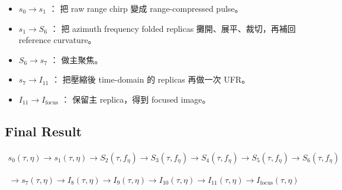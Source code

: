 \documentclass[11pt]{article}
\providecommand{\tightlist}{%
  \setlength{\itemsep}{0pt}\setlength{\parskip}{0pt}}
\begin{document}
\begin{itemize}
\tightlist
\item
  \(s_0 \rightarrow s_1\) ： 把 raw range chirp 變成 range-compressed
  pulse。
\item
  \(s_1 \rightarrow S_6\) ： 把 azimuth frequency folded replicas
  攤開、展平、裁切，再補回 reference curvature。
\item
  \(S_6 \rightarrow s_7\) ： 做主聚焦。
\item
  \(s_7 \rightarrow I_{11}\) ： 把壓縮後 time-domain 的 replicas
  再做一次 UFR。
\item
  \(I_{11} \rightarrow I_{\mathrm{focus}}\) ： 保留主 replica，得到
  focused image。
\end{itemize}

\hypertarget{final-result}{%
\subsection{Final Result}\label{final-result}}

\begin{equation}
\begin{aligned}
s_0(\tau,\eta)\rightarrow s_1(\tau,\eta)\rightarrow S_2(\tau,f_\eta)\rightarrow S_3(\tau,f_\eta)\rightarrow S_4(\tau,f_\eta)\rightarrow S_5(\tau,f_\eta)\rightarrow S_6(\tau,f_\eta)
\end{aligned}
\end{equation}

\begin{equation}
\begin{aligned}
\rightarrow s_7(\tau,\eta)\rightarrow I_8(\tau,\eta)\rightarrow I_9(\tau,\eta)\rightarrow I_{10}(\tau,\eta)\rightarrow I_{11}(\tau,\eta)\rightarrow I_{\mathrm{focus}}(\tau,\eta)
\end{aligned}
\end{equation}
\end{document}
